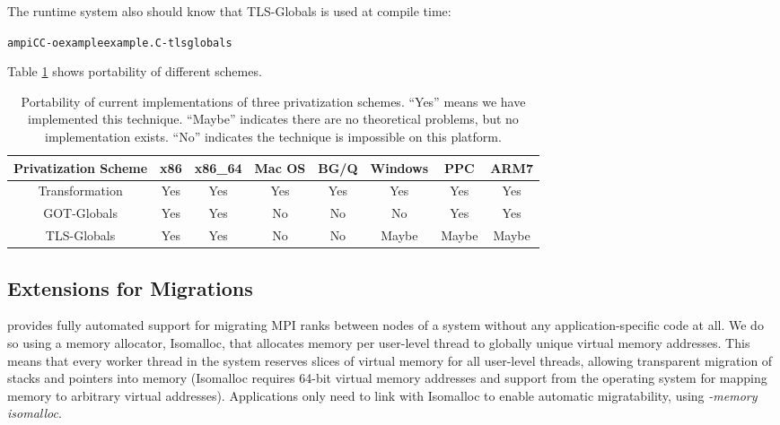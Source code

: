 \documentclass[10pt]{article}
\begin{document}
The runtime system also should know that TLS-Globals is used at compile time:

\begin{alltt}
ampiCC -o example example.C -tlsglobals
\end{alltt}
Table \ref{tab:portability} shows portability of different schemes.

\begin{table}[!tb]
\begin{center}
\begin{tabular}{|c||c|c|c|c|c|c|c|}
\hline
Privatization Scheme     & x86     & x86\_64  & Mac OS & BG/Q  & Windows & PPC   & ARM7  \\
\hline
\hline
Transformation           & Yes     & Yes     & Yes     & Yes   & Yes     & Yes   & Yes   \\
\hline
GOT-Globals              & Yes     & Yes     & No      & No    & No      & Yes   & Yes   \\
\hline
TLS-Globals              & Yes     & Yes     & No      & No    & Maybe   & Maybe & Maybe \\
\hline
\end{tabular}
\caption{Portability of current implementations of three privatization schemes.
``Yes'' means we have implemented this technique.
``Maybe'' indicates there are no theoretical problems, but no implementation exists.
``No'' indicates the technique is impossible on this platform.}
\label{tab:portability}
\vspace{-1.0cm}
\end{center}
\end{table}
\subsection{Extensions for Migrations}

\ampi{} provides fully automated support for migrating MPI ranks between nodes of a
system without any application-specific code at all. We do so using a memory
allocator, Isomalloc, that allocates memory per user-level thread to globally
unique virtual memory addresses. This means that every worker thread in the system
reserves slices of virtual memory for all user-level threads, allowing transparent migration
of stacks and pointers into memory (Isomalloc requires 64-bit virtual memory
addresses and support from the operating system for mapping memory to arbitrary
virtual addresses). Applications only need to link with Isomalloc to enable
automatic migratability, using \emph{-memory isomalloc}.
\end{document}
